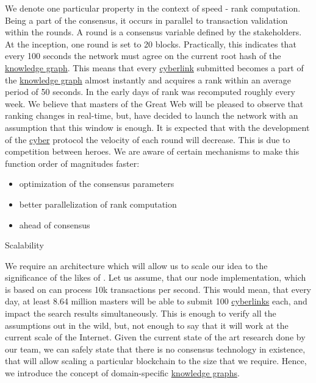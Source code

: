 \documentclass[8pt,oneside]{amsart}
\makeatletter
\newcommand{\linkred}[2]{\href{#1}{\color{red}{#2}}}
\newcommand{\linkgreen}[2]{\href{#1}{\color{green}{#2}}}
\renewcommand\subsection{\@startsection{subsection}
                                    {2}{\z@}
                                    {-3.25ex\@plus -1ex \@minus -.2ex}
                                    {0ex \@plus .2ex}
                                    {\play\Large}
                        }
\newcommand{\titleSection}[1]{\subsection{#1}}
\makeatother
\begin{document}
We denote one particular \linkred{https://github.com/cybercongress/go-cyber}{go-cyber} property in the context of speed - rank computation. Being a part of the consensus, it occurs in parallel to transaction validation within the rounds. A round is a consensus variable defined by the stakeholders. At the inception, one round is set to 20 blocks. Practically, this indicates that every 100 seconds the network must agree on the current root hash of the {\hyperref[knowledge-graph]{knowledge graph}}. This means that every {\hyperref[cyberlinks]{cyberlink}} submitted becomes a part of the {\hyperref[knowledge-graph]{knowledge graph}} almost instantly and acquires a rank within an average period of 50 seconds. In the early days of \linkred{https://google.com}{Google} rank was recomputed roughly every week. We believe that masters of the Great Web will be pleased to observe that ranking changes in real-time, but, have decided to launch the network with an assumption that this window is enough. It is expected that with the development of the {\hyperref[cyber]{cyber}} protocol the velocity of each round will decrease. This is due to competition between heroes. We are aware of certain mechanisms to make this function order of magnitudes faster:

\begin{itemize}
\item optimization of the consensus parameters
\item better parallelization of rank computation
\item \linkgreen{https://ipfs.io/ipfs/QmbsKzizZVVVzPbZvg1qSsNMkwmA3MFufgXb3MFqbSnmPs}{better clock} ahead of consensus
\end{itemize}

\titleSection{Scalability}\label{scalability}

We require an architecture which will allow us to scale our idea to the significance of the likes of \linkred{https://google.com}{Google}. Let us assume, that our node implementation, which is based on \linkred{https://github.com/cosmos/cosmos-sdk}{Cosmos-SDK} can process 10k transactions per second. This would mean, that every day, at least 8.64 million masters will be able to submit 100 {\hyperref[cyberlinks]{cyberlinks}} each, and impact the search results simultaneously. This is enough to verify all the assumptions out in the wild, but, not enough to say that it will work at the current scale of the Internet. Given the current state of the art research done by our team, we can safely state that there is no consensus technology in existence, that will allow scaling a particular blockchain to the size that we require. Hence, we introduce the concept of domain-specific {\hyperref[knowledge-graph]{knowledge graphs}}.
\end{document}
